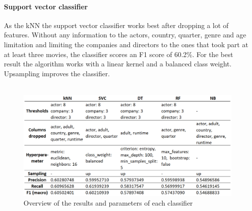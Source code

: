 \paragraph{Support vector classifier}
As the kNN the support vector classifier works best after dropping a lot of features. Without any information to the actors, country, quarter, genre and age limitation and limiting the companies and directors to the ones that took part at at least three movies, the classifier scores an F1 score of 60.2\%. For the best result the algorithm works with a linear kernel and a balanced class weight. Upsampling improves the classifier.
\\ \\
\begin{figure}[h]
\includegraphics[width=\textwidth]{images/Classifier.png}
	\caption[Overview of the results and parameters of each classifier]{Overview of the results and parameters of each classifier\footnotemark}
\label{img:classifiers}
\end{figure}
\FloatBarrier
{}

